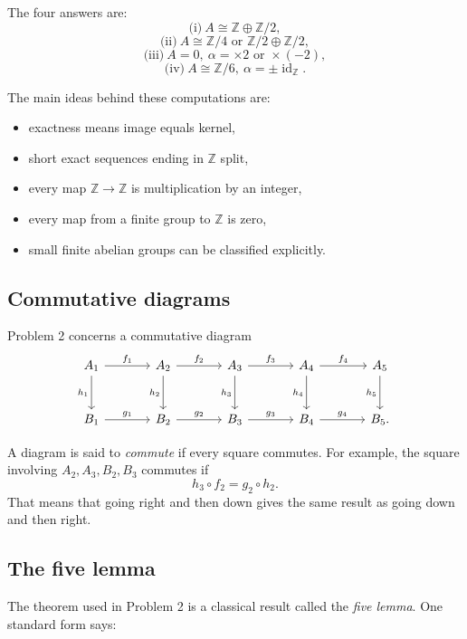\documentclass[12pt,a4paper]{article}
\theoremstyle{notespace}
\begin{document}
The four answers are:
\[
\boxed{\text{(i)}\ A\cong \mathbb Z\oplus \mathbb Z/2,}
\]
\[
\boxed{\text{(ii)}\ A\cong \mathbb Z/4 \text{ or } \mathbb Z/2\oplus \mathbb Z/2,}
\]
\[
\boxed{\text{(iii)}\ A=0,\ \alpha=\times 2 \text{ or } \times(-2),}
\]
\[
\boxed{\text{(iv)}\ A\cong \mathbb Z/6,\ \alpha=\pm \operatorname{id}_{\mathbb Z}.}
\]

The main ideas behind these computations are:

\begin{itemize}
	\item exactness means image equals kernel,
	\item short exact sequences ending in \(\mathbb Z\) split,
	\item every map \(\mathbb Z\to \mathbb Z\) is multiplication by an integer,
	\item every map from a finite group to \(\mathbb Z\) is zero,
	\item small finite abelian groups can be classified explicitly.
\end{itemize}

\subsection{Commutative diagrams}

Problem 2 concerns a commutative diagram
\[
\begin{tikzcd}[column sep=large, row sep=large]
	A_1 \arrow[r,"f_1"] \arrow[d,"h_1"'] &
	A_2 \arrow[r,"f_2"] \arrow[d,"h_2"'] &
	A_3 \arrow[r,"f_3"] \arrow[d,"h_3"'] &
	A_4 \arrow[r,"f_4"] \arrow[d,"h_4"'] &
	A_5 \arrow[d,"h_5"'] \\
	B_1 \arrow[r,"g_1"] &
	B_2 \arrow[r,"g_2"] &
	B_3 \arrow[r,"g_3"] &
	B_4 \arrow[r,"g_4"] &
	B_5.
\end{tikzcd}
\]

A diagram is said to \emph{commute} if every square commutes. For example, the square involving \(A_2,A_3,B_2,B_3\) commutes if
\[
h_3\circ f_2=g_2\circ h_2.
\]
That means that going right and then down gives the same result as going down and then right.

\subsection{The five lemma}

The theorem used in Problem 2 is a classical result called the \emph{five lemma}. One standard form says:

\medskip
\end{document}
